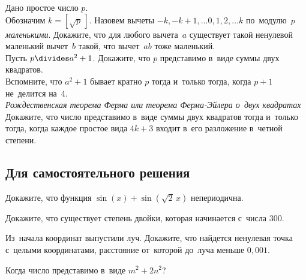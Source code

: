 \begin{problems}

\item
Дано простое число $p$.
\\
\subproblem
Обозначим $k = [\sqrt{p}\,]$.
Назовем вычеты $-k, -k+1, \ldots 0, 1, 2, \ldots k$ по~модулю~$p$
\emph{маленькими}.
Докажите, что для любого вычета~$a$ существует такой ненулевой маленький
вычет~$b$ такой, что вычет~$a b$ тоже маленький.
\\
\subproblem
Пусть $p \divides a^2 + 1$.
Докажите, что $p$ представимо в~виде суммы двух квадратов.
\\
\subproblem
Вспомните, что $a^2 + 1$ бывает кратно $p$ тогда и~только тогда, когда $p + 1$
не~делится на~4.
\\
\subproblem
\emph{Рождественская теорема Ферма или теорема Ферма-Эйлера о~двух квадратах}
Докажите, что число представимо в~виде суммы двух квадратов тогда и~только
тогда, когда каждое простое вида $4 k + 3$ входит в~его разложение в~четной
степени.

\end{problems}

\subsection*{Для самостоятельного решения}

\begin{problems}

\item
Докажите, что функция $\sin(x) + \sin(\sqrt{2} \, x)$ непериодична.

\item
Докажите, что существует степень двойки, которая начинается с~числа $300$.

\item
Из~начала координат выпустили луч.
Докажите, что найдется ненулевая точка с~целыми координатами, расстояние
от~которой до~луча меньше $0{,}001$.

\item
Когда число представимо в~виде $m^2 + 2 n^2$?

\end{problems}


